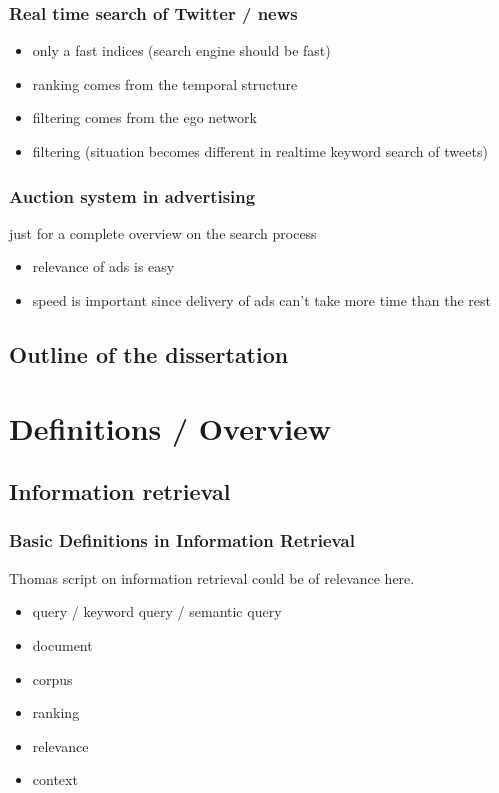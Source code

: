 \documentclass[•]{article}
\begin{document}
\subsubsection{Real time search of Twitter / news}
\begin{itemize}
\item only a fast indices (search engine should be fast)
\item ranking comes from the temporal structure
\item filtering comes from the ego network
\item filtering (situation becomes different in realtime keyword search of tweets)
\end{itemize}

\subsubsection{Auction system in advertising}
just for a complete overview on the search process
\begin{itemize}
\item relevance of ads is easy
\item speed is important since delivery of ads can't take more time than the rest
\end{itemize}
\subsection{Outline of the dissertation}


\pagebreak
\section{Definitions / Overview}
\subsection{Information retrieval}
\subsubsection{Basic Definitions in Information Retrieval}
Thomas script on information retrieval could be of relevance here.
\begin{itemize}
\item query / keyword query / semantic query
\item document
\item corpus
\item ranking
\item relevance
\item context
\end{itemize}
\end{document}

